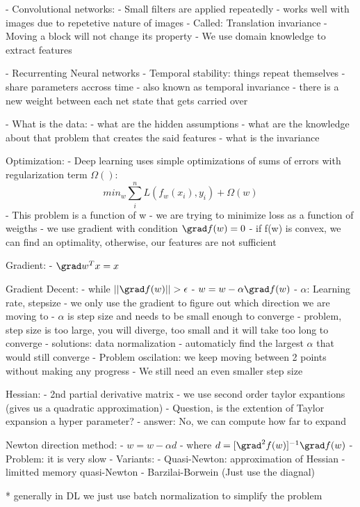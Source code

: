 - Convolutional networks:
 - Small filters are applied repeatedly
 - works well with images due to repetetive nature of images
  - Called: Translation invariance
   - Moving a block will not change its property
  - We use domain knowledge to extract features

- Recurrenting Neural networks
 - Temporal stability: things repeat themselves
 - share parameters accross time
 - also known as temporal invariance
 - there is a new weight between each net state that gets carried over

- What is the data:
 - what are the hidden assumptions
 - what are the knowledge about that problem that creates the said features
 - what is the invariance

Optimization:
- Deep learning uses simple optimizations of sums of errors with regularization term $\Omega()$:
\[min_w \sum^n_i L(f_w(x_i),y_i) + \Omega(w)\]
- This problem is a function of w
- we are trying to minimize loss as a function of weigths
- we use gradient with condition $\grad f(w) = 0$
- if f(w) is convex, we can find an optimality, otherwise, our features are not sufficient

Gradient:
- $\grad w^Tx = x$

Gradient Decent:
- while $||\grad f(w) || > \epsilon$
 - $w = w - \alpha \grad f(w)$
- $\alpha$: Learning rate, stepsize
- we only use the gradient to figure out which direction we are moving to
- $\alpha$ is step size and needs to be small enough to converge
- problem, step size is too large, you will diverge, too small and it will take too long to converge
 - solutions: data normalization
 - automaticly find the largest $\alpha$ that would still converge
- Problem oscilation: we keep moving between 2 points without making any progress
 - We still need an even smaller step size

Hessian:
- 2nd partial derivative matrix
- we use second order taylor expantions (gives us a quadratic approximation)
- Question, is the extention of Taylor expansion a hyper parameter?
- answer: No, we can compute how far to expand

Newton direction method:
- $w = w - \alpha d$
- where $d = [\grad^2 f(w)]^{-1}\grad f(w)$
- Problem: it is very slow
- Variants:
 - Quasi-Newton: approximation of Hessian
 - limitted memory quasi-Newton
 - Barzilai-Borwein (Just use the diagnal)

* generally in DL we just use batch normalization to simplify the problem
